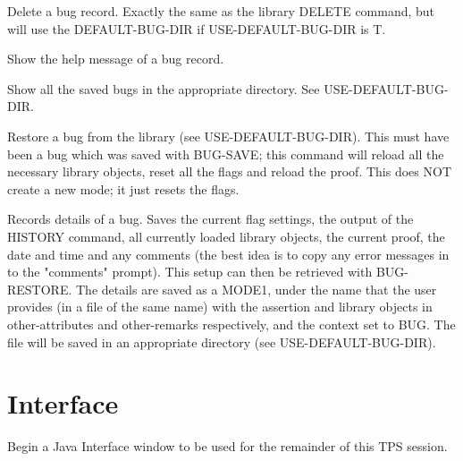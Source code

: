 \begin{description} 
\item[\parbox{\textwidth}{BUG-DELETE \textit{name}}]  
Delete a bug record. Exactly the same as the library
DELETE command, but will use the DEFAULT-BUG-DIR if 
USE-DEFAULT-BUG-DIR is T.

\item[\parbox{\textwidth}{BUG-HELP \textit{name}}]  
Show the help message of a bug record.

\item[\parbox{\textwidth}{BUG-LIST}]  
Show all the saved bugs in the appropriate directory.
See USE-DEFAULT-BUG-DIR.

\item[\parbox{\textwidth}{BUG-RESTORE \textit{name}}]  
Restore a bug from the library (see USE-DEFAULT-BUG-DIR). 
This must have been a bug which was saved with BUG-SAVE; 
this command will reload all the necessary library objects, 
reset all the flags and reload the proof.
This does NOT create a new mode; it just resets the flags.

\item[\parbox{\textwidth}{BUG-SAVE \textit{name} \textit{comment}}]  
Records details of a bug. Saves the current flag settings, the output
of the HISTORY command, all currently loaded library objects, the 
current proof, the date and time and any comments (the best idea 
is to copy any error messages in to the "comments" prompt). 
This setup can then be retrieved with BUG-RESTORE.
The details are saved as a MODE1, under the name that the user provides
(in a file of the same name) with the assertion and library objects in
other-attributes and other-remarks respectively, and the context set
to BUG. The file will be saved in an appropriate directory (see
USE-DEFAULT-BUG-DIR).
\item
\end{description}

\section{Interface}

\begin{description} 
\item[\parbox{\textwidth}{JAVAWIN \textit{fontsize} \textit{popups}}]  
Begin a Java Interface window to be used for the remainder of this
TPS session.
\item
\end{description}
